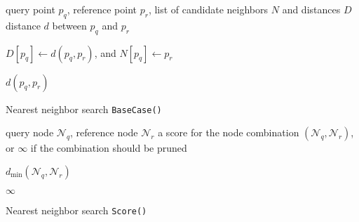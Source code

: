 \begin{algorithm}[tb]
\begin{algorithmic}
     query point $p_q$, reference point $p_r$, list of
candidate neighbors $N$ and distances $D$
     distance $d$ between $p_q$ and $p_r$

    \medskip

    \STATE  $D[p_q] \gets d(p_q, p_r)$, and $N[p_q] \gets p_r$
    \ENDIF

    \RETURN $d(p_q, p_r)$
  \end{algorithmic}

  \caption{Nearest neighbor search \texttt{BaseCase()}}
  \label{alg:nn_base_case}
\end{algorithm}

\begin{algorithm}[tb]
  \begin{algorithmic}
     query node $\mathscr{N}_q$, reference node
$\mathscr{N}_r$
     a score for the node combination $(\mathscr{N}_q,
\mathscr{N}_r)$, or $\infty$ if the combination should be pruned

    \medskip

      \RETURN $d_{\min}(\mathscr{N}_q, \mathscr{N}_r)$
    \ENDIF

    \RETURN $\infty$
  \end{algorithmic}

  \caption{Nearest neighbor search \texttt{Score()}}
  \label{alg:nn_score}
\end{algorithm}

